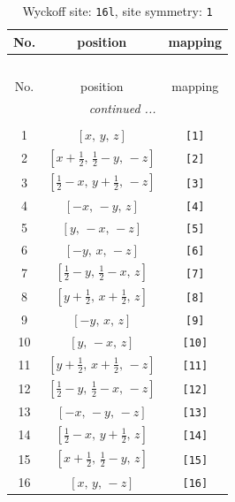 \documentclass[fleqn,8pt]{jsarticle}
\begin{document}
\begin{longtable}{ccc}
\caption{Wyckoff site: {\tt 16l}, site symmetry: {\tt 1}}
 \\
 \hline \hline
No. & position & mapping \\ \hline \endfirsthead

\multicolumn{2}{l}{\tablename\ \thetable{}} \\
 \hline \hline
No. & position & mapping \\ \hline \endhead

 \hline \hline
\multicolumn{2}{r}{\footnotesize\it continued ...} \\ \endfoot

 \hline \hline
\multicolumn{2}{r}{} \\ \endlastfoot

1 & $\left[ x,\, y,\, z \right]$ & {\tt [1]} \\ \hline
2 & $\left[ x + \frac{1}{2},\, \frac{1}{2} - y,\, - z \right]$ & {\tt [2]} \\ \hline
3 & $\left[ \frac{1}{2} - x,\, y + \frac{1}{2},\, - z \right]$ & {\tt [3]} \\ \hline
4 & $\left[ - x,\, - y,\, z \right]$ & {\tt [4]} \\ \hline
5 & $\left[ y,\, - x,\, - z \right]$ & {\tt [5]} \\ \hline
6 & $\left[ - y,\, x,\, - z \right]$ & {\tt [6]} \\ \hline
7 & $\left[ \frac{1}{2} - y,\, \frac{1}{2} - x,\, z \right]$ & {\tt [7]} \\ \hline
8 & $\left[ y + \frac{1}{2},\, x + \frac{1}{2},\, z \right]$ & {\tt [8]} \\ \hline
9 & $\left[ - y,\, x,\, z \right]$ & {\tt [9]} \\ \hline
10 & $\left[ y,\, - x,\, z \right]$ & {\tt [10]} \\ \hline
11 & $\left[ y + \frac{1}{2},\, x + \frac{1}{2},\, - z \right]$ & {\tt [11]} \\ \hline
12 & $\left[ \frac{1}{2} - y,\, \frac{1}{2} - x,\, - z \right]$ & {\tt [12]} \\ \hline
13 & $\left[ - x,\, - y,\, - z \right]$ & {\tt [13]} \\ \hline
14 & $\left[ \frac{1}{2} - x,\, y + \frac{1}{2},\, z \right]$ & {\tt [14]} \\ \hline
15 & $\left[ x + \frac{1}{2},\, \frac{1}{2} - y,\, z \right]$ & {\tt [15]} \\ \hline
16 & $\left[ x,\, y,\, - z \right]$ & {\tt [16]} \\
\end{longtable}
\end{document}
